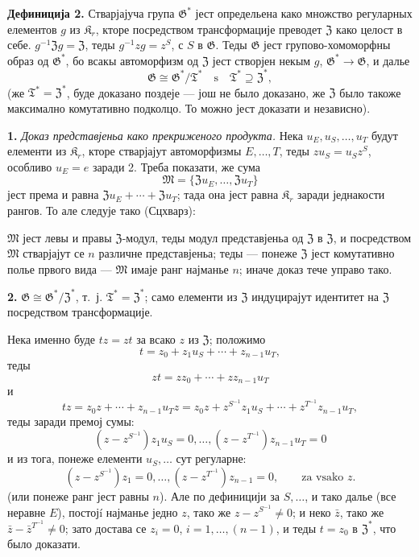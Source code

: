 \documentclass[11pt]{article}
\begin{document}
\noindent\textbf{Дефиниција 2.} Стварјајуча група \(\mathfrak G^*\) јест определьена како множство регуларных елементов \(g\) из \(\mathfrak K_r\), кторе посредством трансформације преводет \(\mathfrak Z\) како целост в себе. \(g^{-1}\mathfrak Zg=\mathfrak Z\), теды \(g^{-1}zg=z^S\), с \(S\) в \(\mathfrak G\). Теды \(\mathfrak G\) јест групово-хомоморфны образ од \(\mathfrak G^*\), бо всакы автоморфизм од \(\mathfrak Z\) јест створјен некым \(g\), \(\mathfrak G^*\to\mathfrak G\), и далье
\[
\mathfrak G\cong\mathfrak G^*/\mathfrak T^*
\quad\text{s}\quad
\mathfrak T^*\supseteq\mathfrak Z^*,
\]
(же \(\mathfrak T^*=\mathfrak Z^*\), буде доказано поздеје --- још не было доказано, же \(\mathfrak Z\) было такоже максимално комутативно подколцо. То можно јест доказати и независно).

\noindent\textbf{1.} \emph{Доказ представјеньа како прекриженого продукта.} Нека \(u_E,u_S,\ldots,u_T\) будут елементи из \(\mathfrak K_r\), кторе стварјајут автоморфизмы \(E,\ldots,T\), теды \(zu_S=u_Sz^S\), особливо \(u_E=e\) заради 2. Треба показати, же сума
\[
\mathfrak M=\{\mathfrak Zu_E,\ldots,\mathfrak Zu_T\}
\]
јест према и равна \(\mathfrak Zu_E+\cdots+\mathfrak Zu_T\); тада она јест равна \(\mathfrak K_r\) заради једнакости рангов. То але следује тако (Сцхварз):

\(\mathfrak M\) јест левы и правы \(\mathfrak Z\)-модул, теды модул представјеньа од \(\mathfrak Z\) в \(\mathfrak Z\), и посредством \(\mathfrak M\) стварјајут се \(n\) различне представјеньа; теды --- понеже \(\mathfrak Z\) јест комутативно полье првого вида --- \(\mathfrak M\) имаје ранг најманье \(n\); иначе доказ тече управо тако.

\noindent\textbf{2.} \(\mathfrak G\cong\mathfrak G^*/\mathfrak Z^*\), т.~ј. \(\mathfrak T^*=\mathfrak Z^*\); само елементи из \(\mathfrak Z\) индуцирајут идентитет на \(\mathfrak Z\) посредством трансформације.

Нека именно буде \(tz=zt\) за всако \(z\) из \(\mathfrak Z\); положимо
\[
t=z_0+z_1u_S+\cdots+z_{n-1}u_T,
\]
теды
\[
zt=zz_0+\cdots+zz_{n-1}u_T
\]
и
\[
tz=z_0z+\cdots+z_{n-1}u_Tz
=z_0z+z^{S^{-1}}z_1u_S+\cdots+z^{T^{-1}}z_{n-1}u_T,
\]
теды заради премој сумы:
\[
(z-z^{S^{-1}})z_1u_S=0,\ldots,
(z-z^{T^{-1}})z_{n-1}u_T=0
\]
и из тога, понеже елементи \(u_S,\ldots\) сут регуларне:
\[
(z-z^{S^{-1}})z_1=0,\ldots,
(z-z^{T^{-1}})z_{n-1}=0,
\qquad\text{za vsako }z.
\]
(или понеже ранг јест равны \(n\)). Але по дефиницији за \(S,\ldots\), и тако далье (все неравне \(E\)), постојí најманье једно \(z\), тако же \(z-z^{S^{-1}}\neq0\); и неко \(\bar z\), тако же \(\bar z-\bar z^{T^{-1}}\neq0\); зато достава се \(z_i=0\), \(i=1,\ldots,(n-1)\), и теды \(t=z_0\) в \(\mathfrak Z^*\), что было доказати.
\end{document}
